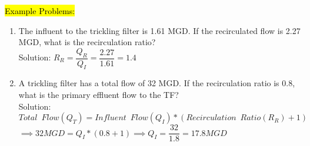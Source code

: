\hl{Example Problems:}\\
\begin{enumerate}
\item The influent to the trickling filter is 1.61 MGD. If the recirculated flow is 2.27 MGD, what is the recirculation ratio?\\
\vspace{0.2cm}
Solution:  $R_R=\dfrac{Q_R}{Q_I}=\dfrac{2.27}{1.61}=\boxed{1.4}$\\
\vspace{0.2cm}
\item A trickling filter has a total flow of 32 MGD.  If the recirculation ratio is 0.8, what is the primary effluent flow to the TF?\\
\vspace{0.2cm}
Solution:\\
\vspace{0.2cm}
$Total \enspace Flow (Q_T) = Influent \enspace Flow (Q_I)*(Recirculation \enspace Ratio(R_R) +1)$\\
$\implies 32 MGD=Q_I*(0.8+1)\implies Q_I=\dfrac{32}{1.8}=\boxed{17.8 MGD}$
\end{enumerate}
